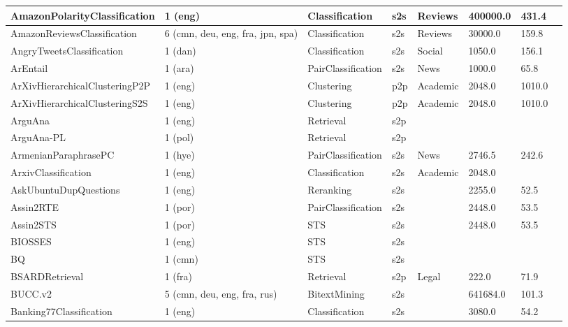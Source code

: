 \begin{longtable}{L{5.0cm}|L{1.5cm}L{1.4cm}L{1.4cm}L{1.4cm}L{1.4cm}L{1.0cm}L{1.0cm}}
 \hline 
AmazonPolarityClassification \cite{McAuley2013HiddenFA} & 1 (eng) & Classification & s2s & Reviews & 400000.0 & 431.4 \\
 \hline 
AmazonReviewsClassification \cite{keung2020multilingual} & 6 (cmn, deu, eng, fra, jpn, spa) & Classification & s2s & Reviews & 30000.0 & 159.8 \\
 \hline 
AngryTweetsClassification \cite{pauli2021danlp} & 1 (dan) & Classification & s2s & Social & 1050.0 & 156.1 \\
 \hline 
ArEntail \cite{obeidat2024arentail} & 1 (ara) & PairClassification & s2s & News & 1000.0 & 65.8 \\
 \hline 
ArXivHierarchicalClusteringP2P \cite{arXiv.org e-Print archive} & 1 (eng) & Clustering & p2p & Academic & 2048.0 & 1010.0 \\
 \hline 
ArXivHierarchicalClusteringS2S \cite{arXiv.org e-Print archive} & 1 (eng) & Clustering & p2p & Academic & 2048.0 & 1010.0 \\
 \hline 
ArguAna \cite{boteva2016} & 1 (eng) & Retrieval & s2p &  &  &  \\
 \hline 
ArguAna-PL \cite{wojtasik2024beirpl} & 1 (pol) & Retrieval & s2p &  &  &  \\
 \hline 
ArmenianParaphrasePC \cite{malajyan2020arpa} & 1 (hye) & PairClassification & s2s & News & 2746.5 & 242.6 \\
 \hline 
ArxivClassification \cite{8675939} & 1 (eng) & Classification & s2s & Academic & 2048.0 &  \\
 \hline 
AskUbuntuDupQuestions \cite{wang-2021-TSDAE} & 1 (eng) & Reranking & s2s &  & 2255.0 & 52.5 \\
 \hline 
Assin2RTE \cite{real2020assin} & 1 (por) & PairClassification & s2s &  & 2448.0 & 53.5 \\
 \hline 
Assin2STS \cite{real2020assin} & 1 (por) & STS & s2s &  & 2448.0 & 53.5 \\
 \hline 
BIOSSES \cite{10.1093/bioinformatics/btx238} & 1 (eng) & STS & s2s &  &  &  \\
 \hline 
BQ \cite{raghu-etal-2021-end} & 1 (cmn) & STS & s2s &  &  &  \\
 \hline 
BSARDRetrieval \cite{louis2022statutory} & 1 (fra) & Retrieval & s2p & Legal & 222.0 & 71.9 \\
 \hline 
BUCC.v2 \cite{zweigenbaum-etal-2017-overview} & 5 (cmn, deu, eng, fra, rus) & BitextMining & s2s &  & 641684.0 & 101.3 \\
 \hline 
Banking77Classification \cite{casanueva-etal-2020-efficient} & 1 (eng) & Classification & s2s &  & 3080.0 & 54.2 \\

\end{longtable}

